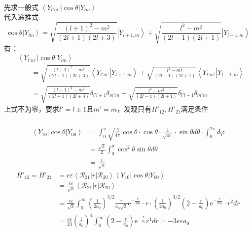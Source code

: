 \begin{frame}
  \frametitle{}
  先求一般式 $ \left\langle  Y_{l'm'} \right\vert \cos\theta \left\vert Y_{lm} \right\rangle $  \\
  代入递推式
  $$
   \cos\theta \left\vert Y_{lm} \right\rangle  = \sqrt{\frac{(l+1)^2-m^2}{(2l+1)(2l+3)}}\left\vert Y_{l+1,m} \right\rangle  + \sqrt{\frac{l^2-m^2}{(2l-1)(2l+1)}}\left\vert Y_{l-1,m} \right\rangle  
  $$ 
  有：
  $$
  \begin{aligned}
   & \left\langle  Y_{l'm'} \right\vert \cos\theta \left\vert Y_{lm} \right\rangle \\
    & \qquad = \sqrt{\frac{(l+1)^2-m^2}{(2l+1)(2l+3)}}\left\langle Y_{l'm'} \left\vert Y_{l+1,m} \right\rangle \right. + \sqrt{\frac{l^2-m^2}{(2l-1)(2l+1)}} \left\langle Y_{l'm'} \left\vert Y_{l-1,m} \right\rangle \right. \\
    &\qquad = \sqrt{\frac{(l+1)^2-m^2}{(2l+1)(2l+3)}} \delta _{l'l+1} \delta _{m'm} + \sqrt{\frac{l^2-m^2}{(2l-1)(2l+1)}} \delta _{l'l-1}\delta _{m'm} 
  \end{aligned}
  $$ 
  上式不为零，要求$l'=l\pm 1$且$m'=m$，发现只有$H'_{12}, H'_{21}$满足条件
\end{frame} 

\begin{frame}
  \frametitle{}
  $$ 
  \begin{aligned}
   \left\langle  Y_{10} \right\vert \cos\theta \left\vert Y_{00} \right\rangle 
   &= \int_{0}^{\pi}\sqrt{\frac{3}{4\pi} }\cos\theta \cdot \cos\theta \cdot \frac{1}{\sqrt{4\pi} } \cdot\sin\theta d \theta \cdot \int_{0}^{2\pi}  d\varphi \\
   &= \frac{\sqrt{3}}{2}\int_{0}^{\pi} \cos^2\theta  \sin \theta d \theta \\
   &= \frac{1}{\sqrt{3} }
  \end{aligned}
  $$   
  $$ 
  \begin{aligned}
    H'_{12} = H'_{21} &= e \varepsilon\left\langle \mathscr{R}_{21}  \right\vert  r \left\vert \mathscr{R}_{20} \right\rangle  \left\langle  Y_{10} \right\vert \cos\theta \left\vert Y_{00} \right\rangle   
     \\ 
     &= \frac{e \varepsilon }{\sqrt{3}} \left\langle \mathscr{R}_{21}  \right\vert  r \left\vert \mathscr{R}_{20} \right\rangle  \\
     &= \frac{e \varepsilon }{\sqrt{3}} \int_{0}^{\infty} \left(\frac{1}{2 a_0}\right)^{3 / 2} \frac{r}{a_0 \sqrt{3}} \mathrm{e}^{-\frac{r}{2 a_0}} \cdot r \cdot \left(\frac{1}{2 a_0}\right)^{3 / 2}\left(2-\frac{r}{a_0}\right) \mathrm{e}^{-\frac{r}{2 a_0}}  \cdot  r^2 dr \\
     &=  \frac{e \varepsilon }{24} (\frac{1}{a_0 })^4  \int_{0}^{\infty} \left(2-\frac{r}{a_0}\right) \mathrm{e}^{-\frac{r}{a_0}} r^4 dr = -3e \varepsilon a_0 \\ 
  \end{aligned}
  $$ 
\end{frame} 

